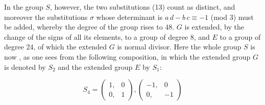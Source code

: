 In the group $S$, however, the two substitutions (13)
count as distinct, and moreover the substitutions
$\sigma$ whose determinant is $a\,d - b\,c \equiv -1$ (mod 3) must be
added, whereby the degree of the group rises to 48.
$G$ is extended, by the change of the signs of
all its elements, to a group of degree 8, and $E$ to a
group of degree 24, of which the extended $G$ is normal divisor.
Here the whole group $S$ is now , as one
sees from the following composition, in which the extended
group $G$ is denoted by $S_2$ and the extended group $E$ by $S_1$:

\[ S_4 = \begin{pmatrix} 1, & 0 \\ 0, & 1 \end{pmatrix}, \begin{pmatrix} -1, & 0 \\ 0, & -1 \end{pmatrix} \]
